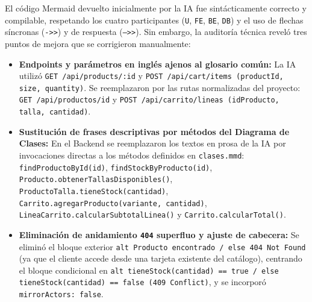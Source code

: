 El código Mermaid devuelto inicialmente por la IA fue sintácticamente correcto y compilable, respetando los cuatro participantes (\texttt{U}, \texttt{FE}, \texttt{BE}, \texttt{DB}) y el uso de flechas síncronas (\texttt{->>}) y de respuesta (\texttt{-->>}). Sin embargo, la auditoría técnica reveló tres puntos de mejora que se corrigieron manualmente:
\begin{itemize}[leftmargin=*,nosep]
\item \textbf{Endpoints y parámetros en inglés ajenos al glosario común:} La IA utilizó \texttt{GET /api/products/:id} y \texttt{POST /api/cart/items (productId, size, quantity)}. Se reemplazaron por las rutas normalizadas del proyecto: \texttt{GET /api/productos/id} y \texttt{POST /api/carrito/lineas (idProducto, talla, cantidad)}.
\item \textbf{Sustitución de frases descriptivas por métodos del Diagrama de Clases:} En el Backend se reemplazaron los textos en prosa de la IA por invocaciones directas a los métodos definidos en \texttt{clases.mmd}: \texttt{findProductoById(id)}, \texttt{findStockByProducto(id)}, \texttt{Producto.obtenerTallasDisponibles()}, \texttt{ProductoTalla.tieneStock(cantidad)}, \texttt{Carrito.agregarProducto(variante, cantidad)}, \texttt{LineaCarrito.calcularSubtotalLinea()} y \texttt{Carrito.calcularTotal()}.
\item \textbf{Eliminación de anidamiento \texttt{404} superfluo y ajuste de cabecera:} Se eliminó el bloque exterior \texttt{alt Producto encontrado / else 404 Not Found} (ya que el cliente accede desde una tarjeta existente del catálogo), centrando el bloque condicional en \texttt{alt tieneStock(cantidad) == true / else tieneStock(cantidad) == false (409 Conflict)}, y se incorporó \texttt{mirrorActors: false}.
\end{itemize}
